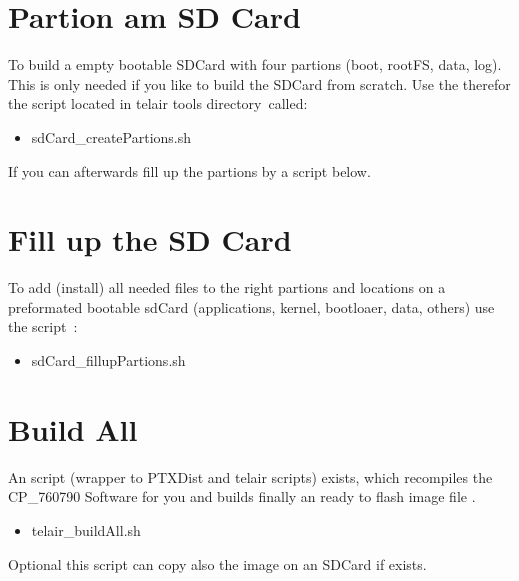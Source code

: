 \section{Partion am SD Card}%
To build a empty bootable SDCard with four partions (boot, rootFS, data, log).
This is only needed if you like to build the SDCard from scratch. Use the
therefor the script located in telair tools directory~\footnotemark[1] called:
\begin{itemize}
    \item   sdCard\_createPartions.sh
\end{itemize}

If you can afterwards fill up the partions by a script below.


\section{Fill up the SD Card}%
    To add (install) all needed files to the right partions and locations
    on a preformated bootable sdCard (applications, kernel, bootloaer, data,
    others) use the script~\footnotemark[1]:
\begin{itemize}
    \item sdCard\_fillupPartions.sh
\end{itemize}

\section{Build All}%
\label{sec:build_all}
An script (wrapper to PTXDist and telair scripts) exists, which recompiles the
CP\_760790 Software for you and builds finally an ready to flash image file
\footnotemark[1].
\begin{itemize}
    \item telair\_buildAll.sh
\end{itemize}

Optional this script can copy also the image on an SDCard if exists.
